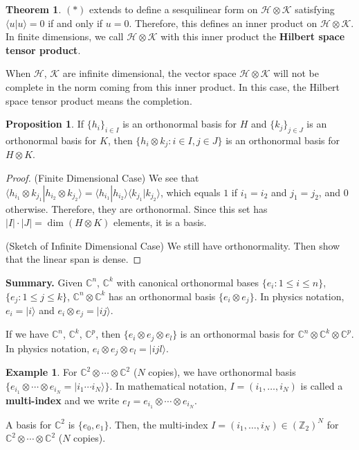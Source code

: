 \documentclass[12pt]{article}
\theoremstyle{definition}
\newtheorem*{theorem}{Theorem}
\newtheorem*{proposition}{Proposition}
\newtheorem*{example}{Example}
\newcommand{\ket}[1]{|#1\rangle}
\newcommand{\C}{\mathbb{C}}
\newcommand{\Z}{\mathbb{Z}}
\begin{document}
\begin{theorem}
$(*)$ extends to define a sesquilinear form on $\mathcal{H} \otimes \mathcal{K}$ satisfying $\langle u|u\rangle = 0$ if and only if $u = 0$. Therefore, this defines an inner product on $\mathcal{H} \otimes \mathcal{K}$. In finite dimensions, we call $\mathcal{H} \otimes \mathcal{K}$ with this inner product the \textbf{Hilbert space tensor product}.

When $\mathcal{H}$, $\mathcal{K}$ are infinite dimensional, the vector space $\mathcal{H} \otimes \mathcal{K}$ will not be complete in the norm coming from this inner product. In this case, the Hilbert space tensor product means the completion.
\end{theorem}

\begin{proposition}
If $\{h_i\}_{i \in I}$ is an orthonormal basis for $H$ and $\{k_j\}_{j \in J}$ is an orthonormal basis for $K$, then $\{h_i \otimes k_j : i \in I, j \in J\}$ is an orthonormal basis for $H \otimes K$.
\end{proposition}

\begin{proof}
(Finite Dimensional Case) We see that $\langle h_{i_1} \otimes k_{j_1} | h_{i_2} \otimes k_{j_2}\rangle = \langle h_{i_1}|h_{i_2}\rangle\langle k_{j_1}|k_{j_2}\rangle$, which equals $1$ if $i_1=i_2$ and $j_1=j_2$, and $0$ otherwise. Therefore, they are orthonormal. Since this set has $|I| \cdot |J| = \dim(H \otimes K)$ elements, it is a basis.

(Sketch of Infinite Dimensional Case) We still have orthonormality. Then show that the linear span is dense.
\end{proof}

\textbf{Summary.} Given $\C^n$, $\C^k$ with canonical orthonormal bases $\{e_i : 1 \leq i \leq n\}$, $\{e_j : 1 \leq j \leq k\}$, $\C^n \otimes \C^k$ has an orthonormal basis $\{e_i \otimes e_j\}$. In physics notation, $e_i = \ket{i}$ and $e_i \otimes e_j = \ket{ij}$.

If we have $\C^n$, $\C^k$, $\C^p$, then $\{e_i \otimes e_j \otimes e_l\}$ is an orthonormal basis for $\C^n \otimes \C^k \otimes \C^p$. In physics notation, $e_i \otimes e_j \otimes e_l = \ket{ijl}$.

\begin{example}
For $\C^2 \otimes \cdots \otimes \C^2$ ($N$ copies), we have orthonormal basis $\{e_{i_1} \otimes \cdots \otimes e_{i_N} = \ket{i_1\cdots i_N}\}$. In mathematical notation, $I = (i_1,\ldots,i_N)$ is called a \textbf{multi-index} and we write $e_I = e_{i_1} \otimes \cdots \otimes e_{i_N}$.

A basis for $\C^2$ is $\{e_0, e_1\}$. Then, the multi-index $I = (i_1,\ldots,i_N) \in (\Z_2)^N$ for $\C^2 \otimes \cdots \otimes \C^2$ ($N$ copies).
\end{example}
\end{document}
